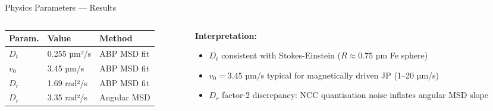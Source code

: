 \begin{frame}{Physics Parameters — Results}
\begin{columns}
\begin{column}{0.50\textwidth}
\small\begin{tabular}{|l|l|l|}
\hline
\textbf{Param.} & \textbf{Value} & \textbf{Method} \\
\hline
$D_t$ & 0.255 µm²/s  & ABP MSD fit \\
\hline
$v_0$ & 3.45 µm/s   & ABP MSD fit \\
\hline
$D_r$ & 1.69 rad²/s & ABP MSD fit \\
\hline
$D_r$ & 3.35 rad²/s & Angular MSD \\
\hline
\end{tabular}

\end{column}
\begin{column}{0.50\textwidth}
\textbf{Interpretation:}
\begin{itemize}\small
    \item $D_t$ consistent with Stokes-Einstein ($R\approx0.75$ µm Fe sphere)
    \item $v_0 = 3.45$ µm/s typical for magnetically driven JP (1–20 µm/s)
    \item $D_r$ factor-2 discrepancy: NCC quantisation noise inflates angular MSD slope
\end{itemize}
\end{column}
\end{columns}
\end{frame}
